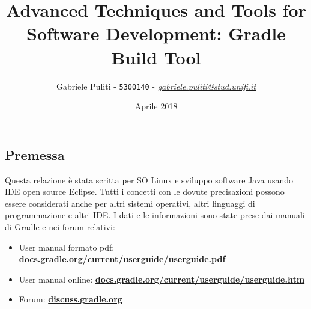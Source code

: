\documentclass{article}
\title{\textbf{Advanced Techniques and Tools for Software Development: Gradle Build Tool}}
\author{Gabriele Puliti - \texttt{5300140} - \href{mailto:gabriele.puliti@stud.unifi.it}{\textit{gabriele.puliti@stud.unifi.it}}}
\date{Aprile 2018}
\begin{document}
\maketitle

\newpage
\tableofcontents
\newpage

\begin{flushleft}

\section{Premessa}
Questa relazione è stata scritta per SO Linux e sviluppo software Java usando IDE open source Eclipse. Tutti i concetti con le dovute precisazioni possono essere considerati anche per altri sistemi operativi, altri linguaggi di programmazione e altri IDE. I dati e le informazioni sono state prese dai manuali di Gradle e nei forum relativi:
\begin{itemize}
    \item User manual formato pdf: \textbf{\href{https://docs.gradle.org/current/userguide/userguide.pdf}{docs.gradle.org/current/userguide/userguide.pdf}}
    \item User manual online: \textbf{\href{https://docs.gradle.org/current/userguide/userguide.html}{docs.gradle.org/current/userguide/userguide.htm}}
    \item Forum: \textbf{\href{https://discuss.gradle.org/}{discuss.gradle.org}}
\end{itemize}


\newpage


\newpage

\newpage

\newpage


\end{flushleft}
\end{document}
